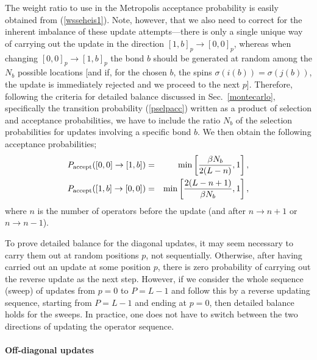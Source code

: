 \documentclass[draft,numberedheadings]{aipproc}
\begin{document}
The weight ratio to use in the Metropolis acceptance probability is easily obtained from (\ref{wsseheis1}). Note, however, that we also need to correct for
the inherent imbalance of these update attempts---there is only a single unique way of carrying out the update in the direction $[1,b]_p \to [0,0]_p$, whereas 
when changing $[0,0]_p \to [1,b]_p$ the bond $b$ should be generated at random among the $N_b$ possible locations [and if, for the chosen $b$, the spins
$\sigma(i(b)) = \sigma(j(b))$, the update is immediately rejected and we proceed to the next $p$]. Therefore, following the criteria for detailed 
balance discussed in Sec.~\ref{montecarlo}, specifically the transition probability (\ref{pselpacc}) written as a product of selection and acceptance 
probabilities, we have to include the ratio $N_b$ of the selection probabilities for updates involving a specific bond $b$. We then obtain the following 
acceptance probabilities;
\begin{eqnarray}
P_{\rm accept}([0,0] \to [1,b]) & = & {\rm min}\left [ \frac{\beta N_b}{2(L-n)},1\right ], \label{paccsseheis1} \\
P_{\rm accept}([1,b] \to [0,0]) & = & {\rm min}\left [ \frac{2(L-n+1)}{\beta N_b},1\right ], \label{paccsseheis2}
\end{eqnarray}
where $n$ is the number of operators before the update (and after $n\to n+1$ or $n\to n-1$).  

To prove detailed balance for the diagonal updates, it may seem necessary to carry them out at random positions $p$, not sequentially.
Otherwise, after having carried out an update at some position $p$, there is zero probability of carrying out the reverse update as the next step. However, if 
we consider the whole sequence (sweep) of updates from $p=0$ to $P=L-1$ and follow this by a reverse updating sequence, starting from $P=L-1$ and 
ending at $p=0$, then detailed balance holds for the sweeps. In practice, one does not have to switch between the two directions of updating the 
operator sequence. 

\paragraph{Off-diagonal updates}
\end{document}
